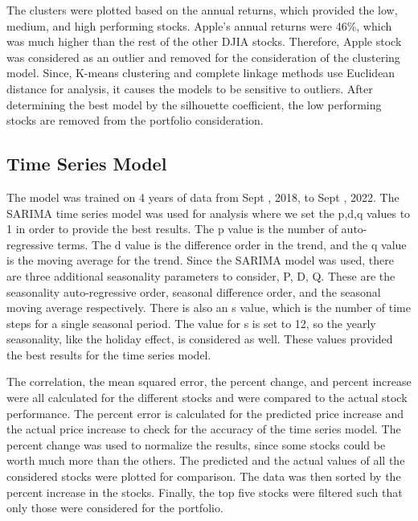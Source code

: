 \documentclass[12pt,a4paper, twoside]{article}
\begin{document}
\begin{multicols}{2}
The clusters were plotted based on the annual returns, which provided the low, medium, and high performing stocks. Apple’s annual returns were 46\%, which was much higher than the rest of the other DJIA stocks. Therefore, Apple stock was considered as an outlier and removed for the consideration of the clustering model. Since, K-means clustering and complete linkage methods use Euclidean distance for analysis, it causes the models to be sensitive to outliers. After determining the best model by the silhouette coefficient, the low performing stocks are removed from the portfolio consideration. 

\subsection{Time Series Model}
The model was trained on 4 years of data from Sept , 2018, to Sept , 2022. The SARIMA time series model was used for analysis where we set the p,d,q values to 1 in order to provide the best results. The p value is the number of auto-regressive terms. The d value is the difference order in the trend, and the q value is the moving average for the trend. Since the SARIMA model was used, there are three additional seasonality parameters to consider, P, D, Q. These are the seasonality auto-regressive order, seasonal difference order, and the seasonal moving average respectively. There is also an s value, which is the number of time steps for a single seasonal period. The value for s is set to 12, so the yearly seasonality, like the holiday effect, is considered as well. These values provided the best results for the time series model.
 
The correlation, the mean squared error, the percent change, and percent increase were all calculated for the different stocks and were compared to the actual stock performance. The percent error is calculated for the predicted price increase and the actual price increase to check for the accuracy of the time series model. The percent change was used to normalize the results, since some stocks could be worth much more than the others. The predicted and the actual values of all the considered stocks were plotted for comparison. The data was then sorted by the percent increase in the stocks. Finally, the top five stocks were filtered such that only those were considered for the portfolio.


\end{multicols}
\end{document}
